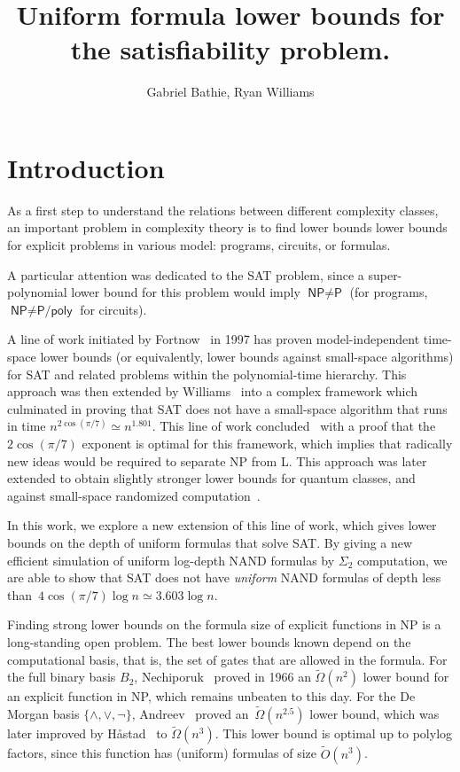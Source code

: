 \documentclass[a4paper, 11pt]{article}
\title{Uniform formula lower bounds for the satisfiability problem.}
\author{Gabriel Bathie, Ryan Williams}
\theoremstyle{plain}
\theoremstyle{definition}
\theoremstyle{remark}
\newcommand{\Omegat}[1]{\widetilde{\Omega}\left( #1 \right)}%
\newcommand{\Ot}[1]{\widetilde{O}\left( #1 \right)}%
\newcommand{\Poly}{\textsf{P}}%
\newcommand{\Log}{\textsf{L}}%
\newcommand{\NP}{\textsf{NP}}%
\newcommand{\SAT}{\textsf{SAT}}%
\newcommand{\NAND}{\textsf{NAND}}%
\begin{document}
\maketitle

\section{Introduction}

As a first step to understand the relations between different complexity classes,
an important problem in complexity theory is to find
lower bounds lower bounds for explicit problems in various model: programs, circuits, or formulas.

A particular attention was dedicated to the \SAT{} problem, 
since a super-polynomial lower bound for this problem would imply $\NP \neq \Poly$
(for programs, $\NP \neq \textsf{P/poly}$ for circuits).

A line of work initiated by Fortnow~\cite{fortnow2000time,fortnow2005time} in 1997 
has proven model-independent time-space lower bounds
(or equivalently, lower bounds against small-space algorithms) for \SAT{}
and related problems within the polynomial-time hierarchy.
This approach was then extended by Williams~\cite{williams2006inductive,williams2007time,williams2013alternation} 
into a complex framework which culminated in proving that \SAT{} 
does not have a small-space algorithm that runs in time $n^{2\cos(\pi/7)}  \simeq n^{1.801}$.
This line of work concluded~\cite{buss2015limits} with a proof 
that the $2\cos(\pi/7)$ exponent is optimal for this framework,
which implies that radically new ideas would be required to separate \NP{} from \Log{}.
This approach was later extended to obtain slightly stronger lower bounds
for quantum classes, and against small-space randomized computation~\cite{mudigonda2020time}.

In this work, we explore a new extension of this line of work, 
which gives lower bounds on the depth of uniform formulas that solve \SAT{}.
By giving a new efficient simulation of uniform log-depth \NAND{} formulas 
by $\Sigma_2$ computation, we are able to show that \SAT{}
does not have \textit{uniform} \NAND{} formulas 
of depth less than~$4 \cos(\pi/7) \log n \simeq 3.603 \log n$.

Finding strong lower bounds on the formula size of explicit functions in \NP{}
is a long-standing open problem.
The best lower bounds known depend on the computational basis, that is, 
the set of gates that are allowed in the formula.
For the full binary basis $B_2$, Nechiporuk~\cite{nechiporuk66boolean}
proved in 1966 an $\Omegat{n^2}$ lower bound for an explicit function in \NP{}, 
which remains unbeaten to this day.
For the De Morgan basis $\{\wedge, \vee, \neg\}$, Andreev~\cite{andreev1987method} 
proved an~$\Omegat{n^{2.5}}$ lower bound, 
which was later improved by H{\aa}stad~\cite{hastad1998shrinkage} to $\Omegat{n^{3}}$.
This lower bound is optimal up to polylog factors,
since this function has (uniform) formulas of size $\Ot{n^{3}}$.
\end{document}
